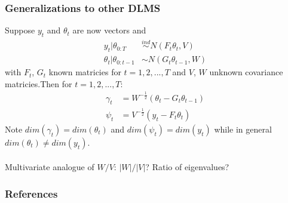 \documentclass[xcolor=dvipsnames]{beamer}\usepackage{graphicx, color}
\begin{document}
\begin{frame}
  \frametitle{Generalizations to other DLMS}
Suppose $y_t$ and $\theta_t$ are now vectors and
\begin{align*}
  y_t|\theta_{0:T} & \stackrel{ind}{\sim} N(F_t\theta_t, V)\\
  \theta_t|\theta_{0:t-1} & \sim N(G_t\theta_{t-1}, W)
\end{align*}
with $F_t$, $G_t$ known matricies for $t=1,2,...,T$ and $V$, $W$ unknown covariance matricies.\pause Then for $t=1,2,...,T$:
\begin{align*}
  \gamma_t & = W^{-\frac{1}{2}}(\theta_t - G_t\theta_{t-1})\\
  \psi_t & = V^{-\frac{1}{2}}(y_t - F_t\theta_t)
\end{align*}
Note $dim(\gamma_t)=dim(\theta_t)$ and $dim(\psi_t)=dim(y_t)$ while in general $dim(\theta_t)\neq dim(y_t)$.\\~\\
\pause
Multivariate analogue of $W/V$: $|W|/|V|$? Ratio of eigenvalues?
\end{frame}
\begin{frame}[allowframebreaks]
        \frametitle{References}
        
        
\end{frame} 
\end{document}
